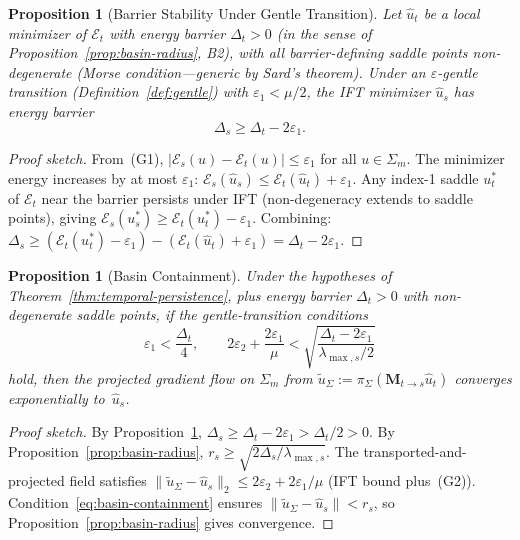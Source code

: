 \documentclass[lettersize,journal]{IEEEtran}
\newtheorem{proposition}[theorem]{Proposition}
\begin{document}
\begin{proposition}[Barrier Stability Under Gentle Transition]
\label{prop:barrier-stability}
Let $\hat{u}_t$ be a local minimizer of $\mathcal{E}_t$ with energy barrier $\Delta_t > 0$ (in the sense of Proposition~\ref{prop:basin-radius}, B2), with all barrier-defining saddle points non-degenerate (Morse condition---generic by Sard's theorem). Under an $\varepsilon$-gentle transition (Definition~\ref{def:gentle}) with $\varepsilon_1 < \mu/2$, the IFT minimizer $\hat{u}_s$ has energy barrier
\begin{equation}
\label{eq:barrier-stability}
\Delta_s \geq \Delta_t - 2\varepsilon_1.
\end{equation}
\end{proposition}

\begin{proof}[Proof sketch]
From~(G1), $|\mathcal{E}_s(u) - \mathcal{E}_t(u)| \leq \varepsilon_1$ for all $u \in \Sigma_m$. The minimizer energy increases by at most $\varepsilon_1$: $\mathcal{E}_s(\hat{u}_s) \leq \mathcal{E}_t(\hat{u}_t) + \varepsilon_1$. Any index-1 saddle $u^*_t$ of $\mathcal{E}_t$ near the barrier persists under IFT (non-degeneracy extends to saddle points), giving $\mathcal{E}_s(u^*_s) \geq \mathcal{E}_t(u^*_t) - \varepsilon_1$. Combining: $\Delta_s \geq (\mathcal{E}_t(u^*_t) - \varepsilon_1) - (\mathcal{E}_t(\hat{u}_t) + \varepsilon_1) = \Delta_t - 2\varepsilon_1$.
\end{proof}

\begin{proposition}[Basin Containment]
\label{prop:basin-containment}
Under the hypotheses of Theorem~\ref{thm:temporal-persistence}, plus energy barrier $\Delta_t > 0$ with non-degenerate saddle points, if the \emph{gentle-transition} conditions
\begin{equation}
\label{eq:basin-containment}
\varepsilon_1 < \frac{\Delta_t}{4}, \qquad 2\varepsilon_2 + \frac{2\varepsilon_1}{\mu} < \sqrt{\frac{\Delta_t - 2\varepsilon_1}{\lambda_{\max,s}/2}}
\end{equation}
hold, then the projected gradient flow on $\Sigma_m$ from $\tilde{u}_\Sigma := \pi_\Sigma(\mathbf{M}_{t \to s}\hat{u}_t)$ converges exponentially to~$\hat{u}_s$.
\end{proposition}

\begin{proof}[Proof sketch]
By Proposition~\ref{prop:barrier-stability}, $\Delta_s \geq \Delta_t - 2\varepsilon_1 > \Delta_t/2 > 0$. By Proposition~\ref{prop:basin-radius}, $r_s \geq \sqrt{2\Delta_s / \lambda_{\max,s}}$. The transported-and-projected field satisfies $\|\tilde{u}_\Sigma - \hat{u}_s\|_2 \leq 2\varepsilon_2 + 2\varepsilon_1/\mu$ (IFT bound plus~(G2)). Condition~\eqref{eq:basin-containment} ensures $\|\tilde{u}_\Sigma - \hat{u}_s\| < r_s$, so Proposition~\ref{prop:basin-radius} gives convergence.
\end{proof}
\end{document}
